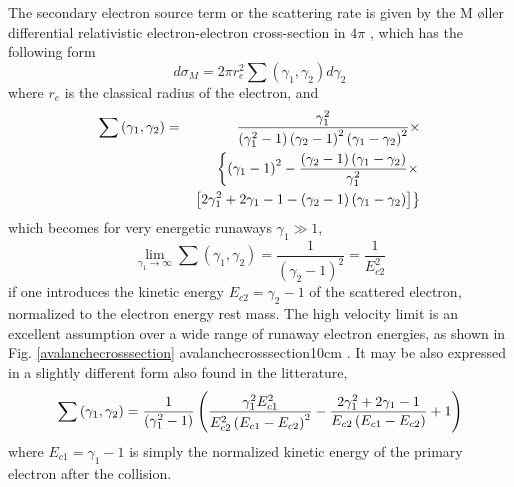The secondary electron source term or the scattering rate is given by the M%
\o ller differential relativistic electron-electron cross-section in $4\pi $
\cite{hei57}, which has the following form 
\begin{equation}
d\sigma _{M}=2\pi r_{e}^{2}\sum \left( \gamma _{1},\gamma _{2}\right)
d\gamma _{2}
\end{equation}%
where $r_{e}$ is the classical radius of the electron, and 
\begin{eqnarray}
\sum \left( \gamma _{1},\gamma _{2}\right)  &=&\frac{\gamma _{1}^{2}}{\left(
\gamma _{1}^{2}-1\right) \left( \gamma _{2}-1\right) ^{2}\left( \gamma
_{1}-\gamma _{2}\right) ^{2}}\times   \notag \\
&&\left\{ \left( \gamma _{1}-1\right) ^{2}-\frac{\left( \gamma _{2}-1\right)
\left( \gamma _{1}-\gamma _{2}\right) }{\gamma _{1}^{2}}\times \right.  
\notag \\
&&\left. \left[ 2\gamma _{1}^{2}+2\gamma _{1}-1-\left( \gamma _{2}-1\right)
\left( \gamma _{1}-\gamma _{2}\right) \right] \right\} 
\end{eqnarray}%
which becomes for very energetic runaways $\gamma _{1}\gg 1$, 
\begin{equation}
\lim_{\gamma _{1}\rightarrow \infty }\sum \left( \gamma _{1},\gamma
_{2}\right) =\frac{1}{\left( \gamma _{2}-1\right) ^{2}}=\frac{1}{E_{c2}^{2}}
\end{equation}%
if one introduces the kinetic energy $E_{c2}=\gamma _{2}-1$ of the scattered
electron, normalized to the electron energy rest mass. The high velocity
limit is an excellent assumption over a wide range of runaway electron
energies, as shown in Fig. \ref{avalanchecrosssection} 
 {avalanchecrosssection}{10cm}%
. It may be also expressed in a slightly different form also found in the
litterature, 
\begin{equation}
\sum \left( \gamma _{1},\gamma _{2}\right) =\frac{1}{\left( \gamma
_{1}^{2}-1\right) }\left( \frac{\gamma _{1}^{2}E_{c1}^{2}}{E_{c2}^{2}\left(
E_{c1}-E_{c2}\right) ^{2}}-\frac{2\gamma _{1}^{2}+2\gamma _{1}-1}{%
E_{c2}\left( E_{c1}-E_{c2}\right) }+1\right) 
\end{equation}%
where $E_{c1}=\gamma _{1}-1$ is simply the normalized kinetic energy of the
primary electron after the collision.


